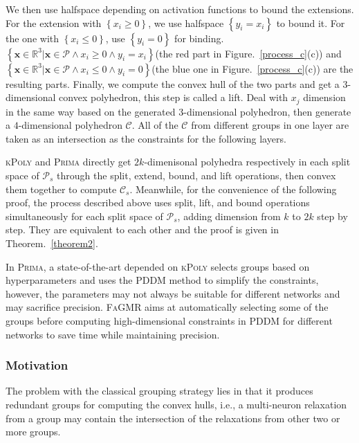 \documentclass[runningheads]{llncs}
\newcommand{\ourtool}{\textsc{FaGMR}\xspace}
\newcommand{\prima}{\textsc{Prima}\xspace}
\newcommand{\krelu}{\textsc{kPoly}\xspace}
\newcommand{\myvec}[1]{\boldsymbol{#1}}
\begin{document}
We then use halfspace depending on activation functions to bound the extensions. For the extension with $\left\{ x_{i} \geq 0 \right\}$, we use halfspace $\left\{ y_{i}=x_{i} \right\}$ to bound it. For the one with $\left\{x_{i} \leq 0 \right\}$, use $\left\{ y_{i} = 0\right\}$ for binding. $\left\{ \myvec{x} \in \mathbb{R}^{3} | \myvec{x} \in \mathcal{P} \wedge x_{i} \geq 0 \wedge y_{i} = x_{i} \right\}$(the red part in Figure.~\ref{process_c}(c))
and $\left\{ \myvec{x} \in \mathbb{R}^{3} | \myvec{x} \in \mathcal{P} \wedge x_{i} \leq 0 \wedge y_{i} = 0 \right\}$(the blue one in Figure.~\ref{process_c}(c)) are the resulting parts.
Finally, we compute the convex hull of the two parts and get a $3$-dimensional convex polyhedron, this step is called a lift. Deal with $x_{j}$ dimension in the same way based on the generated $3$-dimensional polyhedron, then generate a $4$-dimensional polyhedron $\mathcal{C}$. All of the $\mathcal{C}$ from different groups in one layer are taken as an intersection as the constraints for the following layers.

\krelu and \prima directly get $2k$-dimenisonal polyhedra respectively in each split space of $\mathcal{P}_{s}$ through the split, extend, bound, and lift operations, then convex them together to compute $\mathcal{C}_{s}$. Meanwhile, for the convenience of the following proof, the process described above uses split, lift, and bound operations simultaneously for each split space of $\mathcal{P}_{s}$, adding dimension from $k$ to $2k$ step by step. They are equivalent to each other and the proof is given in Theorem.~\ref{theorem2}.

 In \prima, a state-of-the-art depended on \krelu selects groups based on hyperparameters and uses the PDDM method to simplify the constraints, however, the parameters may not always be suitable for different networks and may sacrifice precision. \ourtool aims at automatically selecting some of the groups before computing high-dimensional constraints in PDDM for different networks to save time while maintaining precision. 

%
%
%
\subsubsection{Motivation}
The problem with the classical grouping strategy lies in that it produces
redundant groups for computing the convex hulls, i.e., a multi-neuron relaxation from a group may contain the intersection of the relaxations from other two or more groups. 
\end{document}
